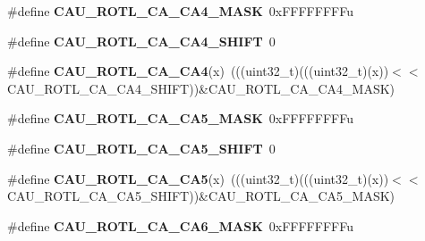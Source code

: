 \begin{DoxyCompactItemize}
\item 
\#define {\bfseries C\+A\+U\+\_\+\+R\+O\+T\+L\+\_\+\+C\+A\+\_\+\+C\+A4\+\_\+\+M\+A\+SK}~0x\+F\+F\+F\+F\+F\+F\+F\+Fu\hypertarget{group__CAU__Register__Masks_gadbb02082ccfd702cac02e0201c2810ae}{}\label{group__CAU__Register__Masks_gadbb02082ccfd702cac02e0201c2810ae}

\item 
\#define {\bfseries C\+A\+U\+\_\+\+R\+O\+T\+L\+\_\+\+C\+A\+\_\+\+C\+A4\+\_\+\+S\+H\+I\+FT}~0\hypertarget{group__CAU__Register__Masks_ga696c3db5a2a4f5c7452d2b3ff573f7c1}{}\label{group__CAU__Register__Masks_ga696c3db5a2a4f5c7452d2b3ff573f7c1}

\item 
\#define {\bfseries C\+A\+U\+\_\+\+R\+O\+T\+L\+\_\+\+C\+A\+\_\+\+C\+A4}(x)~(((uint32\+\_\+t)(((uint32\+\_\+t)(x))$<$$<$C\+A\+U\+\_\+\+R\+O\+T\+L\+\_\+\+C\+A\+\_\+\+C\+A4\+\_\+\+S\+H\+I\+FT))\&C\+A\+U\+\_\+\+R\+O\+T\+L\+\_\+\+C\+A\+\_\+\+C\+A4\+\_\+\+M\+A\+SK)\hypertarget{group__CAU__Register__Masks_ga5f2d73933e12500c6b1e2c437c4255a4}{}\label{group__CAU__Register__Masks_ga5f2d73933e12500c6b1e2c437c4255a4}

\item 
\#define {\bfseries C\+A\+U\+\_\+\+R\+O\+T\+L\+\_\+\+C\+A\+\_\+\+C\+A5\+\_\+\+M\+A\+SK}~0x\+F\+F\+F\+F\+F\+F\+F\+Fu\hypertarget{group__CAU__Register__Masks_gabe2d7ee2c1b7e53de4b94cd8b07970c7}{}\label{group__CAU__Register__Masks_gabe2d7ee2c1b7e53de4b94cd8b07970c7}

\item 
\#define {\bfseries C\+A\+U\+\_\+\+R\+O\+T\+L\+\_\+\+C\+A\+\_\+\+C\+A5\+\_\+\+S\+H\+I\+FT}~0\hypertarget{group__CAU__Register__Masks_gafa3e712c8b162bbf2553bc695bdcab76}{}\label{group__CAU__Register__Masks_gafa3e712c8b162bbf2553bc695bdcab76}

\item 
\#define {\bfseries C\+A\+U\+\_\+\+R\+O\+T\+L\+\_\+\+C\+A\+\_\+\+C\+A5}(x)~(((uint32\+\_\+t)(((uint32\+\_\+t)(x))$<$$<$C\+A\+U\+\_\+\+R\+O\+T\+L\+\_\+\+C\+A\+\_\+\+C\+A5\+\_\+\+S\+H\+I\+FT))\&C\+A\+U\+\_\+\+R\+O\+T\+L\+\_\+\+C\+A\+\_\+\+C\+A5\+\_\+\+M\+A\+SK)\hypertarget{group__CAU__Register__Masks_gab4b993bf334fc493926a37f57c2a0f6e}{}\label{group__CAU__Register__Masks_gab4b993bf334fc493926a37f57c2a0f6e}

\item 
\#define {\bfseries C\+A\+U\+\_\+\+R\+O\+T\+L\+\_\+\+C\+A\+\_\+\+C\+A6\+\_\+\+M\+A\+SK}~0x\+F\+F\+F\+F\+F\+F\+F\+Fu\hypertarget{group__CAU__Register__Masks_ga65aeaeccabea3838690c668b87c2c773}{}\label{group__CAU__Register__Masks_ga65aeaeccabea3838690c668b87c2c773}


\end{DoxyCompactItemize}
